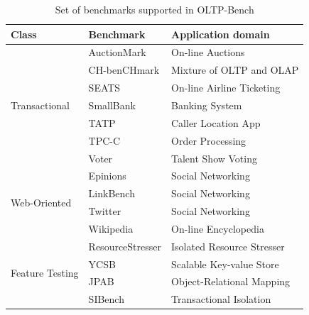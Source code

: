 \begin{table}[h]
	\centering
	\begin{tabular}{|m{3.5cm}|m{3.5cm}|m{6cm}|}
		\hline
		\textbf{Class} & \textbf{Benchmark} & \textbf{Application domain}\\
		\hline
		\multirow{7}{*}{Transactional} & AuctionMark & On-line Auctions\\
		 & CH-benCHmark & Mixture of OLTP and OLAP\\
		 & SEATS & On-line Airline Ticketing\\
		 & SmallBank & Banking System\\
		 & TATP & Caller Location App\\
		 & TPC-C & Order Processing\\
		 & Voter & Talent Show Voting\\
		\hline
		\multirow{4}{*}{Web-Oriented} & Epinions & Social Networking\\
		 & LinkBench & Social Networking\\
		 & Twitter & Social Networking\\
		 & Wikipedia & On-line Encyclopedia\\
		\hline
		\multirow{4}{*}{Feature Testing} & ResourceStresser & Isolated Resource Stresser\\
		 & YCSB & Scalable Key-value Store\\
		 & JPAB & Object-Relational Mapping\\
		 & SIBench & Transactional Isolation\\
		\hline
	\end{tabular}
	\caption{Set of benchmarks supported in OLTP-Bench \cite{difallah14}}
	\label{table:oltpbench_list}
\end{table}
